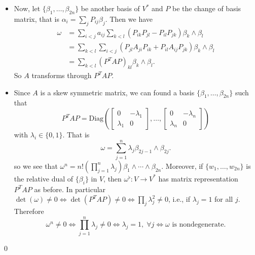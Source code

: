 \begin{itemize}
\begin{equation}
\begin{split}
            &=\sum_{i=1}^{2n}A_{ik}\alpha_i.
        \end{split}
    \end{equation}
    \begin{remark}
        We have $\omega(v_k,v_l)=A_{lk}$, so $(A_{ij})$ is the GRAM matrix of $-\omega$.
    \end{remark}
    \item Now, let $\{\beta_1,\dots, \beta_{2n}\}$ be another basis of $V^*$ and $P$ be the change of basis matrix, that is 
    $\alpha_i=\sum_{j}P_{ij}\beta_j$. Then we have 
    \begin{equation}
        \begin{split}
            \omega &= \sum_{i<j}a_{ij}\sum_{k<l}(P_{ik}P_{jl}-P_{il}P_{jk})\beta_k\wedge\beta_l\\
            &=\sum_{k<l}\sum_{i<j}(P_{jl}A_{ji}P_{ik}+P_{il}A_{ij}P_{jk})\beta_k\wedge\beta_l\\
            &=\sum_{k<l}(P^TAP)_{kl}\beta_k\wedge\beta_l.
        \end{split}
    \end{equation}
    So $A$ transforms through $P^TAP$.
    \item Since $A$ is a skew symmetric matrix, we can found a basis $\{\beta_1,\dots,\beta_{2n}\}$ such that 
    \begin{equation}
        P^TAP = \text{Diag}\left(
        \left[\begin{matrix}
            0&-\lambda_1\\\lambda_1&0
        \end{matrix}\right],\dots,
        \left[\begin{matrix}
            0&-\lambda_{n}\\\lambda_n&0
        \end{matrix}\right]
        \right)
    \end{equation}
    with $\lambda_i\in\{0,1\}$. That is
    \begin{equation}
        \omega = \sum_{j=1}^n\lambda_j\beta_{2j-1}\wedge\beta_{2j}.
    \end{equation}
    so we see that $\omega^n=n!(\prod_{j=1}^n\lambda_j)\beta_1\wedge\cdots\wedge\beta_{2n}$. Moreover, if 
    $\{w_1,\dots,w_{2n}\}$ is the relative dual of $\{\beta_i\}$ in $V$, then $\omega^\flat:V\to V^*$ has matrix representation
    $P^TAP$ as before. In particular $\det(\omega)\neq0\iff\det(P^TAP)\neq0\iff \prod_j\lambda_j^2\neq0$, i.e., if 
    $\lambda_j=1$ for all $j$. Therefore  
    \begin{equation}
        \omega^n\neq0\iff \prod_{j=1}^n\lambda_j\neq0\iff \lambda_j=1,\;\forall j\iff \omega\text{ is nondegenerate}.
    \end{equation}
\end{itemize}
\qed

